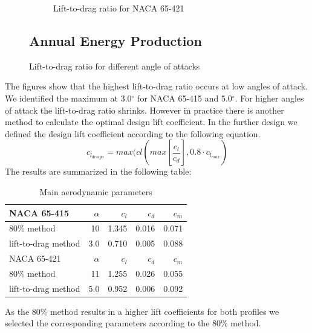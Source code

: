 \documentclass[10pt]{article}
\begin{document}
\begin{figure}[htb!]
\begin{subfigure}{0.5\textwidth}
  \caption{Lift-to-drag ratio for NACA 65-421}
\end{subfigure}\subsection{Annual Energy Production}
\caption{Lift-to-drag ratio for different angle of attacks}
\label{fig:comparison_lift_to_drag}
\end{figure}

The figures show that the highest lift-to-drag ratio occurs at low angles of attack. We identified the maximum at 3.0$^\circ$ for NACA 65-415 and 5.0$^\circ$. For higher angles of attack the lift-to-drag ratio shrinks. However in practice there is another method to calculate the optimal design lift coefficient. In the further design we defined the design lift coefficient according to the following equation.
\begin{equation}
c_{l_{design}} = max(cl(max[\frac{c_l}{c_d}], 0.8\cdot c_{l_{max}})
\end{equation}
The results are summarized in the following table:\\
\begin{table}[H]
\begin{tabular}{l | r r r r}
NACA 65-415 & $\alpha$ &$c_l$ &$c_d$ & $c_m$\\
\hline
80\% method& 10 & 1.345 & 0.016 & 0.071\\
lift-to-drag method & 3.0 & 0.710 & 0.005 &  0.088\\
\hline
NACA 65-421 & $\alpha$ &$c_l$ &$c_d$ & $c_m$\\
\hline
80\% method& 11 & 1.255 & 0.026 & 0.055\\
lift-to-drag method & 5.0 & 0.952 & 0.006 &  0.092\\
\end{tabular}
\caption{Main aerodynamic parameters}
\end{table}

As the 80\% method results in a higher lift coefficients for both profiles we selected the corresponding parameters according to the 80\% method.
\newpage
\end{document}
